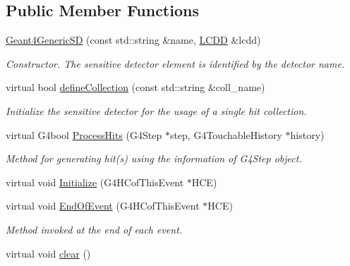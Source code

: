 \subsection*{Public Member Functions}
\begin{DoxyCompactItemize}
\item 
\hyperlink{class_d_d4hep_1_1_simulation_1_1_geant4_generic_s_d_a7ce3d1272f106b20f2f92e50fa2e1996}{Geant4GenericSD} (const std::string \&name, \hyperlink{class_d_d4hep_1_1_geometry_1_1_l_c_d_d}{LCDD} \&lcdd)
\begin{DoxyCompactList}\small\item\em Constructor. The sensitive detector element is identified by the detector name. \item\end{DoxyCompactList}\item 
virtual bool \hyperlink{class_d_d4hep_1_1_simulation_1_1_geant4_generic_s_d_a3c70c7c1f1be8bd0e6364327e28228e4}{defineCollection} (const std::string \&coll\_\-name)
\begin{DoxyCompactList}\small\item\em Initialize the sensitive detector for the usage of a single hit collection. \item\end{DoxyCompactList}\item 
virtual G4bool \hyperlink{class_d_d4hep_1_1_simulation_1_1_geant4_generic_s_d_aecea47598186c697197f51c683f13bbb}{ProcessHits} (G4Step $\ast$step, G4TouchableHistory $\ast$history)
\begin{DoxyCompactList}\small\item\em Method for generating hit(s) using the information of G4Step object. \item\end{DoxyCompactList}\item 
virtual void \hyperlink{class_d_d4hep_1_1_simulation_1_1_geant4_generic_s_d_a1e65440bc948eb7ba84792fcfdd002ed}{Initialize} (G4HCofThisEvent $\ast$HCE)
\item 
virtual void \hyperlink{class_d_d4hep_1_1_simulation_1_1_geant4_generic_s_d_a07009f3334d1f7125c128cc59fc20e6e}{EndOfEvent} (G4HCofThisEvent $\ast$HCE)
\begin{DoxyCompactList}\small\item\em Method invoked at the end of each event. \item\end{DoxyCompactList}\item 
virtual void \hyperlink{class_d_d4hep_1_1_simulation_1_1_geant4_generic_s_d_acf8f9146d5683a8131fc5d8ee26d7f01}{clear} ()

\end{DoxyCompactItemize}
